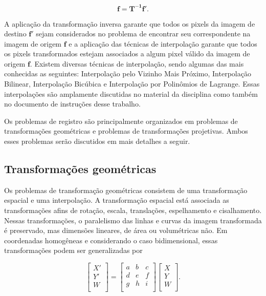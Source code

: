 \documentclass{article}
\begin{document}
\begin{equation}
\mathbf{f} = \mathbf{T^{-1}}\mathbf{f'}.
\label{eq:transinv}
\end{equation}

\noindent
A aplicação da transformação inversa garante que todos os pixels da imagem de destino $\mathbf{f'}$ sejam considerados no problema de encontrar seu correspondente na imagem de origem $\mathbf{f}$ e a aplicação das técnicas de interpolação garante que todos os pixels transformados estejam associados a algum pixel válido da imagem de origem $\mathbf{f}$. Existem diversas técnicas de interpolação, sendo algumas das mais conhecidas as seguintes: Interpolação pelo Vizinho Mais Próximo, Interpolação Bilinear, Interpolação Bicúbica e Interpolação por Polinômios de Lagrange. Essas interpolações são amplamente discutidas no material da disciplina como também no documento de instruções desse trabalho.

Os problemas de registro são principalmente organizados em problemas de transformações geométricas e problemas de transformações projetivas. Ambos esses problemas serão discutidos em mais detalhes a seguir.

\subsection{Transformações geométricas}
Os problemas de transformação geométricas consistem de uma transformação espacial e uma interpolação. A transformação espacial está associada as transformações afins de rotação, escala, translações, espelhamento e cisalhamento. Nessas transformações, o paralelismo das linhas e curvas da imagem transformada é preservado, mas dimensões lineares, de área ou volumétricas não. Em coordenadas homogêneas e considerando o caso bidimensional, essas transformações podem ser generalizadas por

\begin{equation}
\begin{bmatrix} 
X'\\
Y'\\
W \\
\end{bmatrix}
=
\begin{bmatrix} 
a & b & c \\
d & e & f \\
g & h & i \\
\end{bmatrix}
%
\begin{bmatrix} 
X \\
Y \\
W \\
\end{bmatrix}.
\label{eq:transexp}
\end{equation}
\end{document}
